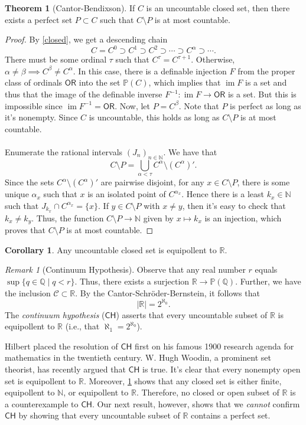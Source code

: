 \documentclass[10pt,letterpaper,cm]{nupset}
\theoremstyle{definition}
\theoremstyle{theorem}
\newtheorem{theorem}[definition]{Theorem}
\newtheorem{corollary}[definition]{Corollary}
\theoremstyle{remark}
\newtheorem{remark}[definition]{Remark}
\newcommand{\N}{\mathbb N}
\renewcommand{\P}{\mathbb P}
\newcommand{\Q}{\mathbb Q}
\newcommand{\R}{\mathbb R}
\newcommand{\1}{\mathbf{1}}
\newcommand{\0}{\vec 0}
\newcommand{\ord}{\mathsf{OR}}
\DeclareMathOperator{\im}{im}
\begin{document}
\begin{theorem}[Cantor-Bendixson]
If $C$ is an uncountable closed set, then there exists a perfect set $P\subset C$ such that $C \setminus P$ is at most countable.
\end{theorem}
\begin{proof}
By \cref{closed}, we get a descending chain $$ C = C^0 \supset C^1 \supset C^2 \supset \cdots \supset C^{\alpha} \supset \cdots.    $$ There must be some ordinal $\tau$ such that $C^{\tau} = C^{\tau +1}$. Otherwise, $\alpha \ne \beta \implies C^{\beta} \ne C^{\alpha}$. In this case, there is a definable injection $F$ from the proper class of ordinals $\ord$ into the set $\P(C)$, which implies that $\im{F}$ is a set and thus that the image of the definable inverse $F^{-1} : \im{F} \to \ord$ is a set. But this is impossible since $\im{F^{-1}} = \ord$. Now, let $P = C^{\beta}$. Note that $P$ is perfect as long as it's nonempty. Since $C$ is uncountable, this holds as long as  $C \setminus P$ is at most countable.
\\ \\ Enumerate the rational intervals $(J_n)_{n\in \N}$. We have that $$ C\setminus P = {\bigcup_{\alpha < \tau} C^{\alpha} \setminus (C^{\alpha})'}.    $$ Since the sets $C^{\alpha} \setminus (C^{\alpha})'$ are pairwise disjoint, for any $x\in C\setminus P$, there is some unique $\alpha_x$ such that $x$ is an isolated point of $C^{\alpha_x}$. Hence there is a least $k_x \in \N$ such that $J_{k_x} \cap C^{\alpha_x} = \{x\}$. If $y \in C \setminus P$ with $x\ne y$, then it's easy to check that $k_x \ne k_y$. Thus, the function $C\setminus P \to \N$ given by $x \mapsto k_x$ is an injection, which proves that $C\setminus P$ is at most countable. 
\end{proof}

\begin{corollary}\label{LC'}
Any uncountable closed set is equipollent to $\R$.
\end{corollary}

\begin{remark}[Continuum Hypothesis] 
Observe that any real number $r$ equals $\sup\{q\in \Q \mid q<r\}$. Thus, there exists a surjection $\R \to \P(\Q)$. Further, we have the inclusion $\bm{\mathcal{C}} \subset \R$. By the Cantor-Schr\"oder-Bernstein, it follows that $$\lvert{\R}\rvert =2^{\aleph_0}.$$ The \textit{continuum hypothesis} ($\mathsf{CH}$) asserts that every uncountable subset of $\R$ is equipollent to $\R$ (i.e., that   $\aleph_1 =2^{\aleph_0}$).

Hilbert placed the resolution of $\mathsf{CH}$ first on his famous 1900 research agenda for mathematics in the twentieth century. W. Hugh Woodin, a prominent set theorist, has recently argued that $\mathsf{CH}$ is true. It's clear that every nonempty open set is equipollent to $\R$. Moreover, \cref{LC'} shows that any closed set is either finite, equipollent to $\N$, or equipollent to $\R$. Therefore, no closed or open subset of $\R$ is a counterexample to $\mathsf{CH}$. Our next result, however, shows that we \emph{cannot} confirm $\mathsf{CH}$ by showing that every uncountable subset of $\R$ contains a perfect set.
\end{remark}
\end{document}
